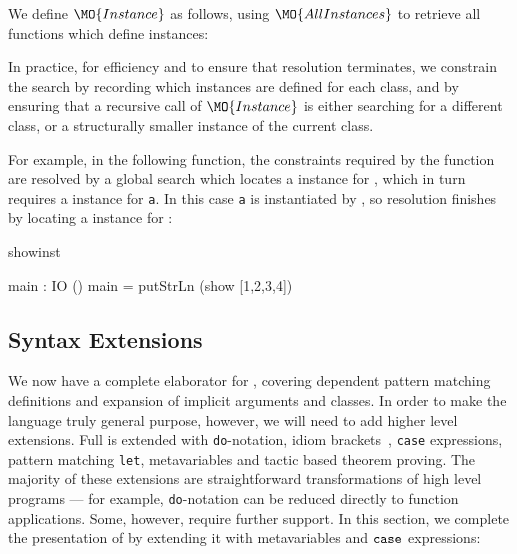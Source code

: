 
We define $\MO{Instance}$ as follows, using $\MO{AllInstances}$ to retrieve
all functions which define instances: 


In practice, for efficiency and to ensure that resolution terminates,
we constrain the search by recording which instances are defined for each
class, and by ensuring that a recursive call of $\MO{Instance}$ is either
searching for a different class, or a structurally smaller instance of the
current class. 

For example, in the following function, the constraints required by the
 function are resolved by a global search which locates a 
instance for , which in turn requires a  instance for
\texttt{a}.  In this case \texttt{a} is instantiated by , so resolution finishes
by locating a  instance for :

\begin{SaveVerbatim}{showinst}

main : IO ()
main = putStrLn (show [1,2,3,4]) 

\end{SaveVerbatim}

\subsection{Syntax Extensions}

We now have a complete elaborator for \IdrisM{}, covering 
dependent pattern matching definitions and expansion of implicit arguments
and classes. In order to make the language truly general purpose, however, we
will need to add higher level extensions. Full \Idris{} is \IdrisM{} extended
with \texttt{do}-notation, idiom brackets~\cite{McBride2007}, \texttt{case} expressions,
pattern matching \texttt{let}, metavariables and tactic based theorem proving.
The majority of these extensions are straightforward transformations of high level
\Idris{} programs --- for example, \texttt{do}-notation can be reduced directly to
\IdrisM{} function applications. Some, however, require further support. In this section,
we complete the presentation of \IdrisM{} by extending it with metavariables
and $\mathtt{case}$ expressions:

